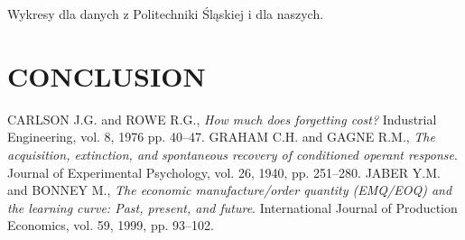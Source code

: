 \documentclass[11pt,a4paper]{article}
\begin{document}
Wykresy dla danych z Politechniki Śląskiej i dla naszych.



\section{CONCLUSION}




\begin{thebibliography}{99}
 \setlength\baselineskip{5pt}
%
 CARLSON J.G. and ROWE R.G., \textit{How much does forgetting cost?} Industrial Engineering, vol. 8, 1976 pp. 40--47.
 GRAHAM C.H. and  GAGNE R.M., \textit{The acquisition, extinction, and spontaneous recovery of conditioned operant response}. Journal of Experimental Psychology, vol. 26, 1940, pp. 251--280.
 JABER Y.M. and BONNEY M., \textit{The economic manufacture/order quantity (EMQ/EOQ) and the learning curve: Past, present, and future}. International Journal of Production Economics, vol. 59, 1999, pp. 93--102.

\end{thebibliography}
\end{document}
